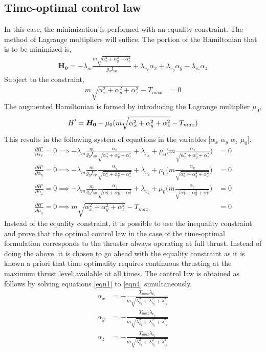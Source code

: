 \subsection{Time-optimal control law}
In this case, the minimization is performed with an equality constraint. The method of Lagrange multipliers will suffice.
The portion of the Hamiltonian that is to be minimized is,
\begin{align}
\boldsymbol{H_0}=-\lambda_m\frac{m\sqrt{\alpha_x^2+\alpha_y^2+\alpha_z^2}}{g_0 I_{sp}}+\lambda_{v_x}\alpha_x+\lambda_{v_y}\alpha_y+\lambda_{v_z}\alpha_z
\end{align}
Subject to the constraint,
\begin{align}
m\sqrt{\alpha_x^2+\alpha_y^2+\alpha_z^2}-T_{max}&= 0\label{con0}
\end{align}
The augmented Hamiltonian is formed by introducing the Lagrange multiplier $\mu_0$,
\begin{align}
\boldmath{H'}=\boldsymbol{H_0}+\mu_0(	m\sqrt{\alpha_x^2+\alpha_y^2+\alpha_z^2}-T_{max})
\end{align}
This results in the following system of equations in the variables [$\alpha_x$ $\alpha_y$ $\alpha_z$ $\mu_0$].
\begin{align}
\frac{\partial H'}{\partial \alpha_x}=0\implies-\lambda_m\frac{m}{g_0 I_{sp}}\frac{\alpha_x}{\sqrt{\alpha_x^2+\alpha_y^2+\alpha_z^2}}+\lambda_{v_x}+\mu_0\bigg(m\frac{\alpha_x}{	\sqrt{\alpha_x^2+\alpha_y^2+\alpha_z^2}}\bigg)&=0\label{eqn1}\\
\frac{\partial H'}{\partial \alpha_y}=0\implies-\lambda_m\frac{m}{g_0 I_{sp}}\frac{\alpha_y}{\sqrt{\alpha_x^2+\alpha_y^2+\alpha_z^2}}+\lambda_{v_y}+\mu_0\bigg(m\frac{\alpha_y}{	\sqrt{\alpha_x^2+\alpha_y^2+\alpha_z^2}}\bigg)&=0\label{eqn2}\\
\frac{\partial H'}{\partial \alpha_z}=0\implies-\lambda_m\frac{m}{g_0 I_{sp}}\frac{\alpha_z}{\sqrt{\alpha_x^2+\alpha_y^2+\alpha_z^2}}+\lambda_{v_z}+\mu_0\bigg(m\frac{\alpha_z}{	\sqrt{\alpha_x^2+\alpha_y^2+\alpha_z^2}}\bigg)&=0\label{eqn3}\\
\frac{\partial H'}{\partial \mu_0}=0\implies m\sqrt{\alpha_x^2+\alpha_y^2+\alpha_z^2}-T_{max}&=0\label{eqn4}
\end{align}
Instead of the equality constraint, it is possible to use the inequality constraint and prove that the optimal control law in the case of the time-optimal formulation corresponds to the thruster always operating at full thrust. Instead of doing the above, it is chosen to go ahead with the equality constraint as it is known a priori that time optimality requires continuous thrusting at the maximum thrust level available at all times.
The control law is obtained as follows by solving equations \ref{eqn1} to \ref{eqn4} simultaneously,
\begin{align}
	\alpha_x&=-\frac{T_{max}\lambda_{v_x}}{m\sqrt{\lambda_{v_x}^2+\lambda_{v_y}^2+\lambda_{v_z}^2}}\\
	\alpha_y&=-\frac{T_{max}\lambda_{v_y}}{m\sqrt{\lambda_{v_x}^2+\lambda_{v_y}^2+\lambda_{v_z}^2}}\\
	\alpha_z&=-\frac{T_{max}\lambda_{v_z}}{m\sqrt{\lambda_{v_x}^2+\lambda_{v_y}^2+\lambda_{v_z}^2}}
\end{align}
